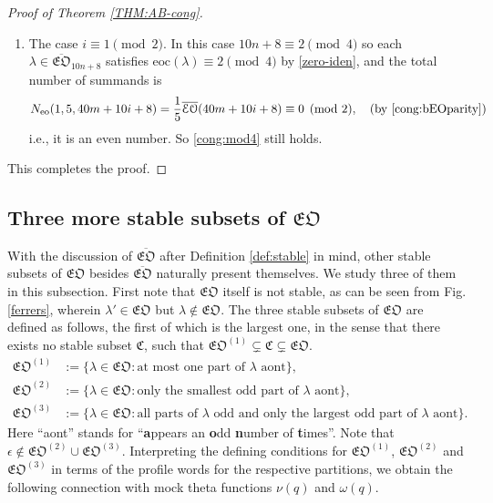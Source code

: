 \documentclass[12pt,reqno]{amsart}
\numberwithin{equation}{section}
\theoremstyle{plain}
\theoremstyle{definition}
\def\fEO{\mathfrak{EO}}
\def\bfEO{\overline{\mathfrak{EO}}}
\begin{document}
\begin{proof}[Proof of Theorem \ref{THM:AB-cong}]
\begin{enumerate}[(1)]
\item The case $i\equiv1\pmod{2}$. In this case $10n+8\equiv 2 \pmod 4$ so each
$\lambda\in\overline{\mathfrak{EO}}_{10n+8}$ satisfies $\textrm{eoc}(\lambda)\equiv 2\pmod 4$ by
\eqref{zero-iden}, and the total number of summands is
\begin{align*}
N_{\textrm{eo}}(1,5,40m+10i+8)=\frac{1}{5}\overline{\mathcal{EO}}(40m+10i+8)\equiv0\pmod{2},
\quad\text{(by~\eqref{cong:bEOparity})}
\end{align*}
i.e., it is an even number. So \eqref{cong:mod4} still holds.
\end{enumerate}
This completes the proof.
\end{proof}


\subsection{Three more stable subsets of \texorpdfstring{$\fEO$}{EO}}\label{subsec:subsets of EO}
With the discussion of $\overline{\fEO}$ after Definition \ref{def:stable} in mind, other stable subsets of
$\fEO$ besides $\bfEO$ naturally present themselves. We study three of them in this subsection. First note
that $\mathfrak{EO}$ itself is not stable, as can be seen from Fig. \ref{ferrers}, wherein
$\lambda'\in\mathfrak{EO}$ but $\lambda\not\in\mathfrak{EO}$. The three stable subsets of $\mathfrak{EO}$
are defined as follows, the first of which is the largest one, in the sense that there exists no stable
subset $\mathfrak{C}$, such that $\mathfrak{EO}^{(1)}\subsetneq\mathfrak{C}\subsetneq\mathfrak{EO}$.
\begin{align*}
\mathfrak{EO}^{(1)} &:=\{\lambda\in\mathfrak{EO}\colon\textrm{at~most~one~part~of~$\lambda$~aont}\},\\
\mathfrak{EO}^{(2)} &:=\{\lambda\in\mathfrak{EO}\colon
\textrm{only~the~smallest~odd~part~of~$\lambda$~aont}\},\\
\mathfrak{EO}^{(3)} &:=\{\lambda\in\mathfrak{EO}\colon
\textrm{all~parts~of~$\lambda$~odd~and~only~the~largest~odd~part~of~$\lambda$ aont}\}.
\end{align*}
Here ``aont'' stands for ``{\bf a}ppears an {\bf o}dd {\bf n}umber of {\bf t}imes''. Note that
$\epsilon\not\in\fEO^{(2)}\cup\fEO^{(3)}$. Interpreting the defining conditions for $\mathfrak{EO}^{(1)}$,
$\mathfrak{EO}^{(2)}$ and $\mathfrak{EO}^{(3)}$ in terms of the profile words for the respective
partitions, we obtain the following connection with mock theta functions $\nu(q)$ and $\omega(q)$.
\end{document}
